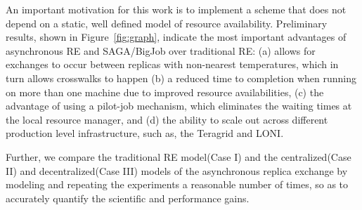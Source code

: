 \documentclass[a4paper,10pt]{article}
\newcommand{\jhanote}[1]{ {\textcolor{red} { ***shantenu: #1 }}}
\newcommand{\athotanote}[1]{ {\textcolor{green} { ***athota: #1 }}}
\newcommand{\jhanote}[1]{}
\newcommand{\athotanote}[1]{}
\begin{document}
An important motivation for this work is to implement a scheme that does not depend on a
static, well defined model of resource availability. %
Preliminary results, shown in Figure~\ref{fig:graph}, indicate the most important advantages of asynchronous RE and SAGA/BigJob over traditional RE: (a) allows for exchanges to occur between replicas with non-nearest temperatures, which in turn allows crosswalks to happen (b) a reduced time to completion when running on more than one machine due to improved resource availabilities, (c) the advantage of using a pilot-job mechanism, which eliminates the waiting times at the local resource manager, and (d) the ability to scale out across different production level infrastructure, such as, the Teragrid and LONI.

Further, we compare the traditional RE model(Case I) and the centralized(Case II) and decentralized(Case III) models of the asynchronous replica exchange by modeling and repeating the experiments a reasonable number of times, so as to accurately quantify the scientific and performance gains. %


 
  
 
\end{document}
